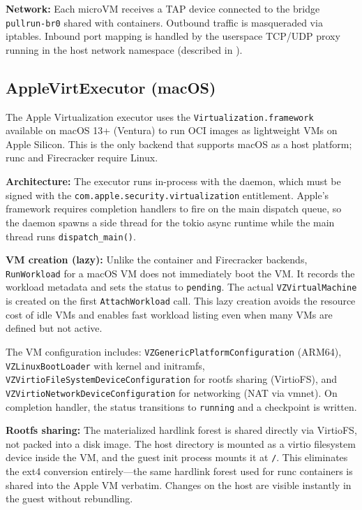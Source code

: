 \documentclass[11pt,a4paper]{article}
\begin{document}
\textbf{Network:} Each microVM receives a TAP device connected to the bridge \texttt{pullrun-br0} shared with containers. Outbound traffic is masqueraded via iptables. Inbound port mapping is handled by the userspace TCP/UDP proxy running in the host network namespace (described in ).

\subsection{AppleVirtExecutor (macOS)}

The Apple Virtualization executor uses the \texttt{Virtualization.framework}~\cite{applevirt} available on macOS 13+ (Ventura) to run OCI images as lightweight VMs on Apple Silicon. This is the only backend that supports macOS as a host platform; runc and Firecracker require Linux.

\textbf{Architecture:} The executor runs in-process with the daemon, which must be signed with the \texttt{com.apple.security.virtualization} entitlement. Apple's framework requires completion handlers to fire on the main dispatch queue, so the daemon spawns a side thread for the tokio async runtime while the main thread runs \texttt{dispatch\_main()}.

\textbf{VM creation (lazy):} Unlike the container and Firecracker backends, \texttt{RunWorkload} for a macOS VM does not immediately boot the VM. It records the workload metadata and sets the status to \texttt{pending}. The actual \texttt{VZVirtualMachine} is created on the first \texttt{AttachWorkload} call. This lazy creation avoids the resource cost of idle VMs and enables fast workload listing even when many VMs are defined but not active.

The VM configuration includes: \texttt{VZGenericPlatformConfiguration} (ARM64), \texttt{VZLinuxBootLoader} with kernel and initramfs, \texttt{VZVirtioFileSystemDeviceConfiguration} for rootfs sharing (VirtioFS), and \texttt{VZVirtioNetworkDeviceConfiguration} for networking (NAT via vmnet). On completion handler, the status transitions to \texttt{running} and a checkpoint is written.

\textbf{Rootfs sharing:} The materialized hardlink forest is shared directly via VirtioFS, not packed into a disk image. The host directory is mounted as a virtio filesystem device inside the VM, and the guest init process mounts it at \texttt{/}. This eliminates the ext4 conversion entirely---the same hardlink forest used for runc containers is shared into the Apple VM verbatim. Changes on the host are visible instantly in the guest without rebundling.
\end{document}
